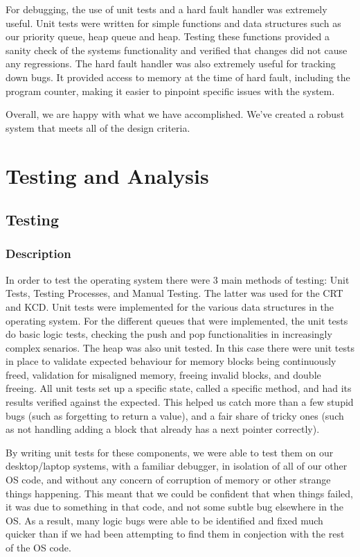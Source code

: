 \documentclass[12pt]{report}
\begin{document}
For debugging, the use of unit tests and a hard fault handler was extremely useful. Unit tests were written for simple functions and data structures such as our priority queue, heap queue and heap. Testing these functions provided a sanity check of the systems functionality and verified that changes did not cause any regressions. The hard fault handler was also extremely useful for tracking down bugs. It provided access to memory at the time of hard fault, including the program counter, making it easier to pinpoint specific issues with the system.

Overall, we are happy with what we have accomplished. We’ve created a robust system that meets all of the design criteria.

\part{Testing and Analysis}

\chapter{Testing}

\section{Description}

In order to test the operating system there were 3 main methods of testing: Unit Tests, Testing Processes, and Manual Testing. The latter was used for the CRT and KCD. Unit tests were implemented for the various data structures in the operating system. For the different queues that were implemented, the unit tests do basic logic tests, checking the push and pop functionalities in increasingly complex senarios. The heap was also unit tested. In this case there were unit tests in place to validate expected behaviour for memory blocks being continuously freed, validation for misaligned memory, freeing invalid blocks, and double freeing. All unit tests set up a specific state, called a specific method, and had its results verified against the expected. This helped us catch more than a few stupid bugs (such as forgetting to return a value), and a fair share of tricky ones (such as not handling adding a block that already has a next pointer correctly).

By writing unit tests for these components, we were able to test them on our desktop/laptop systems, with a familiar debugger, in isolation of all of our other OS code, and without any concern of corruption of memory or other strange things happening. This meant that we could be confident that when things failed, it was due to something in that code, and not some subtle bug elsewhere in the OS. As a result, many logic bugs were able to be identified and fixed much quicker than if we had been attempting to find them in conjection with the rest of the OS code.
\end{document}
